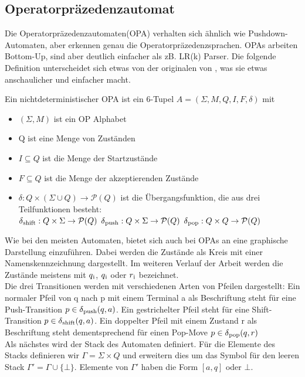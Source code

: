 \subsection{Operatorpräzedenzautomat}
Die Operatorpräzedenzautomaten(OPA) verhalten sich ähnlich wie Pushdown-Automaten, aber erkennen genau die Operatorpräzedenzsprachen. OPAs arbeiten Bottom-Up, sind aber deutlich einfacher als zB. LR(k) Parser. Die folgende Definition \cite{mso, modelchecking} unterscheidet sich etwas von der originalen von \cite{precedence_automata}, was sie etwas anschaulicher und einfacher macht.
\begin{definition}[Operatorpräzedenzautomat]
Ein nichtdeterministischer OPA ist ein 6-Tupel $A=(\Sigma, M, Q, I, F, \delta)$ mit
	\begin{itemize}
	\item
	$(\Sigma, M)$ ist ein OP Alphabet
	\item 
	Q ist eine Menge von Zuständen
	\item
	$I \subseteq Q$ ist die Menge der Startzustände
	\item
	$F \subseteq Q$ ist die Menge der akzeptierenden Zustände
	\item
	$\delta: Q \times (\Sigma \cup Q) \rightarrow \mathcal{P}(Q)$ ist die Übergangsfunktion, die aus drei Teilfunktionen besteht:\\
	$\delta \textsubscript{shift}: Q \times \Sigma \rightarrow \mathcal{P}(Q)$
	$\delta \textsubscript{push}: Q \times \Sigma \rightarrow \mathcal{P}(Q)$
	$\delta \textsubscript{pop}: Q \times Q \rightarrow \mathcal{P}(Q)$
	\end{itemize}
\end{definition}
Wie bei den meisten Automaten, bietet sich auch bei OPAs an eine graphische Darstellung einzuführen. Dabei werden die Zustände als Kreis mit einer Namenskennzeichnung dargestellt. Im weiteren Verlauf der Arbeit werden die Zustände meistens mit $q \textsubscript{i}$, $q \textsubscript{i}$ oder $r \textsubscript{i}$ bezeichnet. \\
Die drei Transitionen werden mit verschiedenen Arten von Pfeilen dargestellt: Ein normaler Pfeil von q nach p mit einem Terminal a als Beschriftung steht für eine Push-Transition $p \in \delta \textsubscript{push}(q, a)$. Ein gestrichelter Pfeil steht für eine Shift-Transition $p \in \delta \textsubscript{shift}(q, a)$. Ein doppelter Pfeil mit einem Zustand r als Beschriftung steht dementsprechend für einen Pop-Move $p \in \delta \textsubscript{pop}(q, r)$\\
Als nächstes wird der Stack des Automaten definiert. Für die Elemente des Stacks definieren wir $\Gamma = \Sigma \times Q$ und erweitern dies um das Symbol für den leeren Stack $\Gamma ' = \Gamma \cup \{\bot\}$. Elemente von $\Gamma'$ haben die Form $\left[a, q\right]$ oder $\bot$.\\
